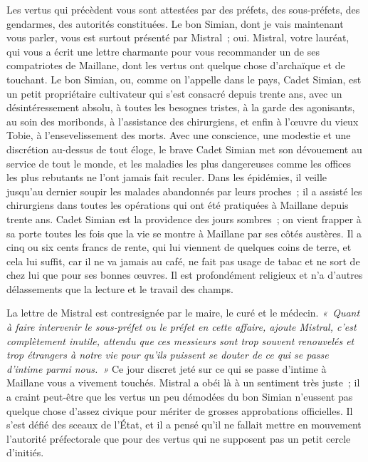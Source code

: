 \documentclass[french,twoside]{book} %
\newcommand\persName[1]{#1}
\newcommand\placeName[1]{#1}
\begin{document}
Les vertus qui précèdent vous sont attestées par des préfets, des sous-préfets, des gendarmes, des autorités constituées. Le bon {\persName Simian}, dont je vais maintenant vous parler, vous est surtout présenté par {\persName Mistral} ; oui. {\persName Mistral}, votre lauréat, qui vous a écrit une lettre charmante pour vous recommander un de ses compatriotes de {\placeName Maillane}, dont les vertus ont quelque chose d’archaïque et de touchant. Le bon {\persName Simian}, ou, comme on l’appelle dans le pays, {\persName Cadet Simian}, est un petit propriétaire cultivateur qui s’est consacré depuis trente ans, avec un désintéressement absolu, à toutes les besognes tristes, à la garde des agonisants, au soin des moribonds, à l’assistance des chirurgiens, et enfin à l’œuvre du vieux {\persName Tobie}, à l’ensevelissement des morts. Avec une conscience, une modestie et une discrétion au-dessus de tout éloge, le brave {\persName Cadet Simian} met son dévouement au service de tout le monde, et les maladies les plus dangereuses comme les offices les plus rebutants ne l’ont jamais fait reculer. Dans les épidémies, il veille jusqu’au dernier soupir les malades abandonnés par leurs proches ; il a assisté les chirurgiens dans toutes les opérations qui ont été pratiquées à {\placeName Maillane} depuis trente ans. {\persName Cadet Simian} est la providence des jours sombres ; on vient frapper à sa porte toutes les fois que la vie se montre à {\placeName Maillane} par ses côtés austères. Il a cinq ou six cents francs de rente, qui lui viennent de quelques coins de terre, et cela lui suffit, car il ne va jamais au café, ne fait pas usage de tabac et ne sort de chez lui que pour ses bonnes œuvres. Il est profondément religieux et n’a d’autres délassements que la lecture et le travail des champs.\par
La lettre de {\persName Mistral} est contresignée par le maire, le curé et le médecin. \emph{« Quant à faire intervenir le sous-préfet ou le préfet en cette affaire, ajoute {\persName Mistral}, c’est complètement inutile, attendu que ces messieurs sont trop souvent renouvelés et trop étrangers à notre vie pour qu’ils puissent se douter de ce qui se passe d’intime parmi nous. »} Ce jour discret jeté sur ce qui se passe d’intime à {\placeName Maillane} vous a vivement touchés. {\persName Mistral} a obéi là à un sentiment très juste ; il a craint peut-être que les vertus un peu démodées du bon {\persName Simian} n’eussent pas quelque chose d’assez civique pour mériter de grosses approbations officielles. Il s’est défié des sceaux de l’État, et il a pensé qu’il ne fallait mettre en mouvement l’autorité préfectorale que pour des vertus qui ne supposent pas un petit cercle d’initiés.\par
\end{document}

